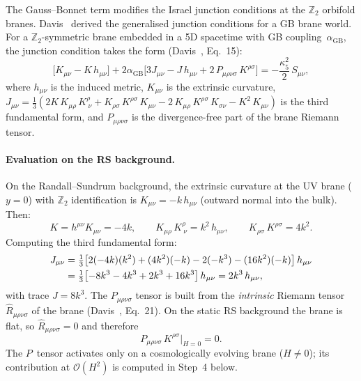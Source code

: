The Gauss--Bonnet term modifies the Israel junction conditions at the $\mathbb{Z}_2$ orbifold branes. Davis~\cite{ch4:Davis2003} derived the generalised junction conditions for a GB brane world. For a $\mathbb{Z}_2$-symmetric brane embedded in a 5D spacetime with GB coupling~$\alpha_{\mathrm{GB}}$, the junction condition takes the form (Davis~\cite{ch4:Davis2003}, Eq.~15):
\begin{equation}
  \bigl[K_{\mu\nu} - K\, h_{\mu\nu}\bigr]
  + 2\alpha_{\mathrm{GB}}\bigl[3J_{\mu\nu} - J\, h_{\mu\nu}
  + 2\, P_{\mu\rho\nu\sigma}\, K^{\rho\sigma}\bigr]
  = -\frac{\kappa_5^2}{2}\, S_{\mu\nu},
  \label{eq:4-davis-jc}
\end{equation}
where $h_{\mu\nu}$ is the induced metric, $K_{\mu\nu}$ is the extrinsic curvature, $J_{\mu\nu} = \tfrac{1}{3}(2K\, K_{\mu\rho}\, K^\rho_{\ \nu} + K_{\rho\sigma}\, K^{\rho\sigma}\, K_{\mu\nu} - 2\, K_{\mu\rho}\, K^{\rho\sigma}\, K_{\sigma\nu} - K^2\, K_{\mu\nu})$ is the third fundamental form, and $P_{\mu\rho\nu\sigma}$ is the divergence-free part of the brane Riemann tensor.

\paragraph{Evaluation on the RS background.}
On the Randall--Sundrum background, the extrinsic curvature at the UV brane ($y = 0$) with $\mathbb{Z}_2$ identification is $K_{\mu\nu} = -k\, h_{\mu\nu}$ (outward normal into the bulk). Then:
\begin{equation}
  K = h^{\mu\nu} K_{\mu\nu} = -4k, \qquad
  K_{\mu\rho}\, K^{\rho}_{\ \nu} = k^2\, h_{\mu\nu}, \qquad
  K_{\rho\sigma}\, K^{\rho\sigma} = 4k^2.
  \label{eq:4-rs-K}
\end{equation}
Computing the third fundamental form:
\begin{align}
  J_{\mu\nu} &= \tfrac{1}{3}\bigl[2(-4k)(k^2) + (4k^2)(-k) - 2(-k^3) - (16k^2)(-k)\bigr]\, h_{\mu\nu} \notag\\
  &= \tfrac{1}{3}\bigl[-8k^3 - 4k^3 + 2k^3 + 16k^3\bigr]\, h_{\mu\nu}
  = 2k^3\, h_{\mu\nu},
  \label{eq:4-Jmunu}
\end{align}
with trace $J = 8k^3$. The $P_{\mu\rho\nu\sigma}$ tensor is built from the \emph{intrinsic} Riemann tensor $\hat{R}_{\mu\rho\nu\sigma}$ of the brane (Davis~\cite{ch4:Davis2003}, Eq.~21). On the static RS background the brane is flat, so $\hat{R}_{\mu\rho\nu\sigma} = 0$ and therefore
\begin{equation}
  P_{\mu\rho\nu\sigma}\, K^{\rho\sigma}\big|_{H=0} = 0.
  \label{eq:4-Ptensor}
\end{equation}
The $P$~tensor activates only on a cosmologically evolving brane ($H \neq 0$); its contribution at $\mathcal{O}(H^2)$ is computed in Step~4 below.

